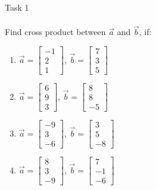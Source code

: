 \documentclass[aspectratio=169,notes]{beamer}
\begin{document}
\begin{frame}[t]{Task 1}
\framesubtitle{}
    Find cross product between $\vec{a}$ and $\vec{b}$, if:
    \begin{multicols}{2}
        \begin{enumerate}
            \item $\vec{a} = \begin{bmatrix}-1\\2\\1\end{bmatrix}$, $\vec{b}=\begin{bmatrix}7\\3\\5\end{bmatrix}$
            \item $\vec{a} = \begin{bmatrix}6\\9\\3\end{bmatrix}$, $\vec{b}=\begin{bmatrix}8\\8\\-5\end{bmatrix}$
            \item $\vec{a} = \begin{bmatrix}-9\\3\\-6\end{bmatrix}$, $\vec{b}=\begin{bmatrix}3\\5\\-8\end{bmatrix}$
            \item $\vec{a} = \begin{bmatrix}8\\3\\-9\end{bmatrix}$, $\vec{b}=\begin{bmatrix}7\\-1\\-6\end{bmatrix}$
        \end{enumerate}
    \end{multicols}
\end{frame}
\end{document}
